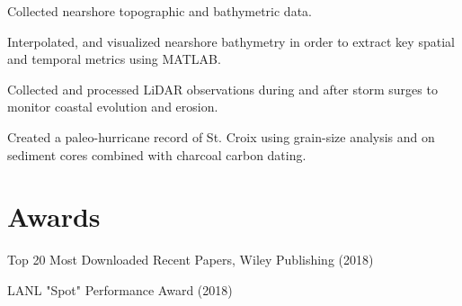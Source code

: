 \documentclass[]{deedy-resume-openfont}
\begin{document}
\begin{minipage}[t]{0.60\textwidth}
\begin{tightemize}
	\item Collected nearshore topographic and bathymetric data.
	\item Interpolated, and visualized nearshore bathymetry in order to extract key spatial and temporal metrics using MATLAB.
\end{tightemize}
\sectionsep

\begin{tightemize}
	\item Collected and processed LiDAR observations during and after storm surges to monitor coastal evolution and erosion.
	\item Created a paleo-hurricane record of St. Croix using grain-size analysis and on sediment cores combined with charcoal carbon dating.
\end{tightemize}
\sectionsep



\section{Awards}
\vspace{\topsep} %
\begin{tightemize}
	\item Top 20 Most Downloaded Recent Papers, Wiley Publishing (2018)
	\item LANL "Spot" Performance Award (2018)
\end{tightemize}


	
\end{minipage}
\end{document}
